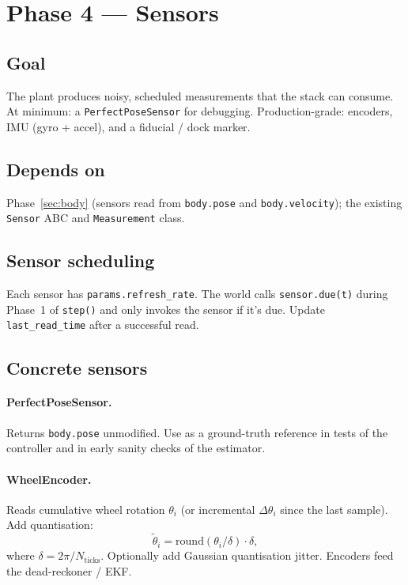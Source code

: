 \documentclass[11pt,a4paper]{article}
\newcommand{\code}[1]{\texttt{\small #1}}
\begin{document}
\section{Phase 4 --- Sensors}
\label{sec:sensors}

\subsection*{Goal}
The plant produces noisy, scheduled measurements that the stack can
consume. At minimum: a \code{PerfectPoseSensor} for debugging.
Production-grade: encoders, IMU (gyro + accel), and a fiducial / dock
marker.

\subsection*{Depends on}
Phase~\ref{sec:body} (sensors read from \code{body.pose} and
\code{body.velocity}); the existing \code{Sensor} ABC and \code{Measurement}
class.

\subsection*{Sensor scheduling}

Each sensor has \code{params.refresh\_rate}. The world calls
\code{sensor.due(t)} during Phase~1 of \code{step()} and only invokes the
sensor if it's due. Update \code{last\_read\_time} after a successful read.

\subsection*{Concrete sensors}

\paragraph{PerfectPoseSensor.} Returns \code{body.pose} unmodified. Use as a
ground-truth reference in tests of the controller and in early sanity
checks of the estimator.

\paragraph{WheelEncoder.} Reads cumulative wheel rotation $\theta_i$ (or
incremental $\Delta \theta_i$ since the last sample). Add quantisation:
\begin{equation}
    \tilde\theta_i = \mathrm{round}(\theta_i / \delta) \cdot \delta,
\end{equation}
where $\delta = 2\pi / N_{\text{ticks}}$. Optionally add Gaussian
quantisation jitter. Encoders feed the dead-reckoner / EKF.
\end{document}
